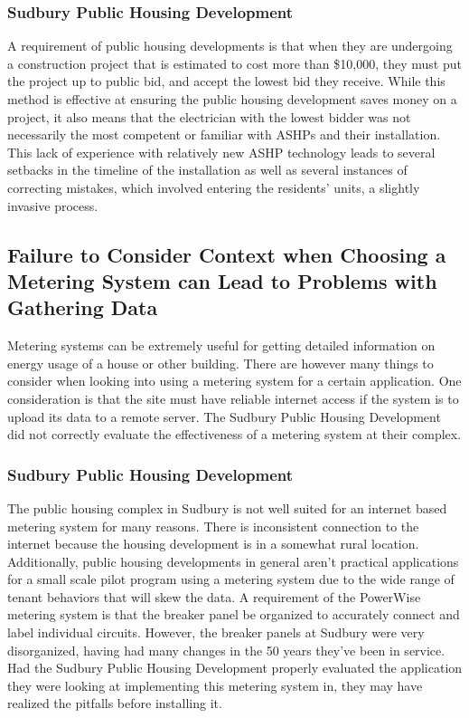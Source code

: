 \subsubsection{Sudbury Public Housing Development}
\par A requirement of public housing developments is that when they are undergoing a construction project that is estimated to cost more than \$10,000, they must put the project up to public bid, and accept the lowest bid they receive. While this method is effective at ensuring the public housing development saves money on a project, it also means that the electrician with the lowest bidder was not necessarily the most competent or familiar with ASHPs and their installation. This lack of experience with relatively new ASHP technology leads to several setbacks in the timeline of the installation as well as several instances of correcting mistakes, which involved entering the residents' units, a slightly invasive process.

\subsection{Failure to Consider Context when Choosing a Metering System can Lead to Problems with Gathering Data}
\par Metering systems can be extremely useful for getting detailed information on energy usage of a house or other building. There are however many things to consider when looking into using a metering system for a certain application. One consideration is that the site must have reliable internet access if the system is to upload its data to a remote server. The Sudbury Public Housing Development did not correctly evaluate the effectiveness of a metering system at their complex.

\subsubsection{Sudbury Public Housing Development}
\par The public housing complex in Sudbury is not well suited for an internet based metering system for many reasons. There is inconsistent connection to the internet because the housing development is in a somewhat rural location. Additionally, public housing developments in general aren't practical applications for a small scale pilot program using a metering system due to the wide range of tenant behaviors that will skew the data. A requirement of the PowerWise metering system is that the breaker panel be organized to accurately connect and label individual circuits. However, the breaker panels at Sudbury were very disorganized, having had many changes in the 50 years they've been in service. Had the Sudbury Public Housing Development properly evaluated the application they were looking at implementing this metering system in, they may have realized the pitfalls before installing it.


